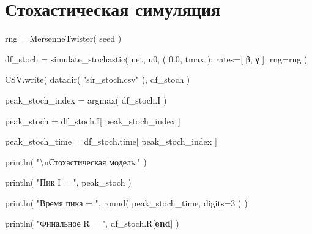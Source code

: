 \documentclass[
  english,
  russian,
  12pt,
  a4paper,
  DIV=11,
  numbers=noendperiod]{scrreprt}
\newenvironment{Shaded}{\begin{snugshade}}{\end{snugshade}}
\newcommand{\FloatTok}[1]{\textcolor[rgb]{0.68,0.00,0.00}{#1}}
\newcommand{\FunctionTok}[1]{\textcolor[rgb]{0.28,0.35,0.67}{#1}}
\newcommand{\KeywordTok}[1]{\textcolor[rgb]{0.00,0.23,0.31}{\textbf{#1}}}
\newcommand{\NormalTok}[1]{\textcolor[rgb]{0.00,0.23,0.31}{#1}}
\newcommand{\OperatorTok}[1]{\textcolor[rgb]{0.37,0.37,0.37}{#1}}
\newcommand{\SpecialCharTok}[1]{\textcolor[rgb]{0.37,0.37,0.37}{#1}}
\newcommand{\StringTok}[1]{\textcolor[rgb]{0.13,0.47,0.30}{#1}}
\begin{document}
\section{Стохастическая
симуляция}\label{ux441ux442ux43eux445ux430ux441ux442ux438ux447ux435ux441ux43aux430ux44f-ux441ux438ux43cux443ux43bux44fux446ux438ux44f}

\begin{Shaded}
\begin{Highlighting}[]
\NormalTok{rng }\OperatorTok{=}
    \FunctionTok{MersenneTwister}\NormalTok{(}
\NormalTok{        seed}
\NormalTok{    )}

\NormalTok{df\_stoch }\OperatorTok{=}
    \FunctionTok{simulate\_stochastic}\NormalTok{(}
\NormalTok{        net,}
\NormalTok{        u0,}
\NormalTok{        (}
            \FloatTok{0.0}\NormalTok{,}
\NormalTok{            tmax}
\NormalTok{        );}
\NormalTok{        rates}\OperatorTok{=}\NormalTok{[}
\NormalTok{            β,}
\NormalTok{            γ}
\NormalTok{        ],}
\NormalTok{        rng}\OperatorTok{=}\NormalTok{rng}
\NormalTok{    )}

\NormalTok{CSV.}\FunctionTok{write}\NormalTok{(}
    \FunctionTok{datadir}\NormalTok{(}
        \StringTok{"sir\_stoch.csv"}
\NormalTok{    ),}
\NormalTok{    df\_stoch}
\NormalTok{)}

\NormalTok{peak\_stoch\_index }\OperatorTok{=}
    \FunctionTok{argmax}\NormalTok{(}
\NormalTok{        df\_stoch.I}
\NormalTok{    )}

\NormalTok{peak\_stoch }\OperatorTok{=}
\NormalTok{    df\_stoch.I[}
\NormalTok{        peak\_stoch\_index}
\NormalTok{    ]}

\NormalTok{peak\_stoch\_time }\OperatorTok{=}
\NormalTok{    df\_stoch.time[}
\NormalTok{        peak\_stoch\_index}
\NormalTok{    ]}

\FunctionTok{println}\NormalTok{(}
    \StringTok{"}\SpecialCharTok{\textbackslash{}n}\StringTok{Стохастическая модель:"}
\NormalTok{)}

\FunctionTok{println}\NormalTok{(}
    \StringTok{"Пик I = "}\NormalTok{,}
\NormalTok{    peak\_stoch}
\NormalTok{)}

\FunctionTok{println}\NormalTok{(}
    \StringTok{"Время пика = "}\NormalTok{,}
    \FunctionTok{round}\NormalTok{(}
\NormalTok{        peak\_stoch\_time,}
\NormalTok{        digits}\OperatorTok{=}\FloatTok{3}
\NormalTok{    )}
\NormalTok{)}

\FunctionTok{println}\NormalTok{(}
    \StringTok{"Финальное R = "}\NormalTok{,}
\NormalTok{    df\_stoch.R[}\KeywordTok{end}\NormalTok{]}
\NormalTok{)}


\end{Highlighting}
\end{Shaded}
\end{document}
